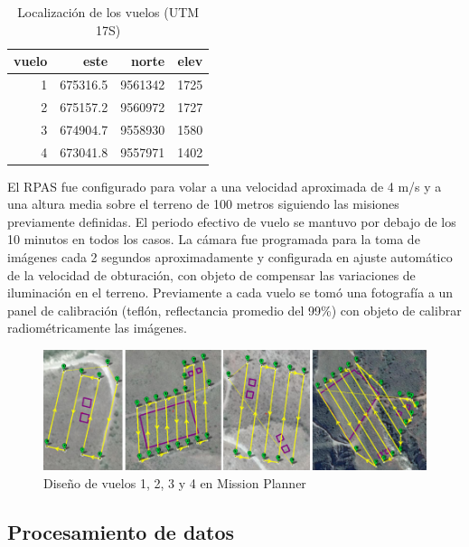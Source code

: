 \documentclass[spanish,openany]{article}
\begin{document}
\begin{table}[!h]

\caption{\label{tab:parcelas}Localización de los vuelos (UTM 17S) }
\centering
\begin{tabular}[t]{rrrr}
\toprule
vuelo & este & norte & elev\\
\midrule
1 & 675316.5 & 9561342 & 1725\\
2 & 675157.2 & 9560972 & 1727\\
3 & 674904.7 & 9558930 & 1580\\
4 & 673041.8 & 9557971 & 1402\\
\bottomrule
\end{tabular}
\end{table}

El RPAS fue configurado para volar a una velocidad aproximada de 4 m/s y
a una altura media sobre el terreno de 100 metros siguiendo las misiones
previamente definidas. El periodo efectivo de vuelo se mantuvo por
debajo de los 10 minutos en todos los casos. La cámara fue programada
para la toma de imágenes cada 2 segundos aproximadamente y configurada
en ajuste automático de la velocidad de obturación, con objeto de
compensar las variaciones de iluminación en el terreno. Previamente a
cada vuelo se tomó una fotografía a un panel de calibración (teflón,
reflectancia promedio del 99\%) con objeto de calibrar radiométricamente
las imágenes.

\begin{figure}[H]
\includegraphics[width=1\linewidth,height=1\textheight]{figures/parcelas_mission_planner} \caption{Diseño de vuelos 1, 2, 3 y 4 en Mission Planner}\label{fig:vuelos}
\end{figure}

\subsection{Procesamiento de datos}\label{procesamiento-de-datos}
\end{document}
